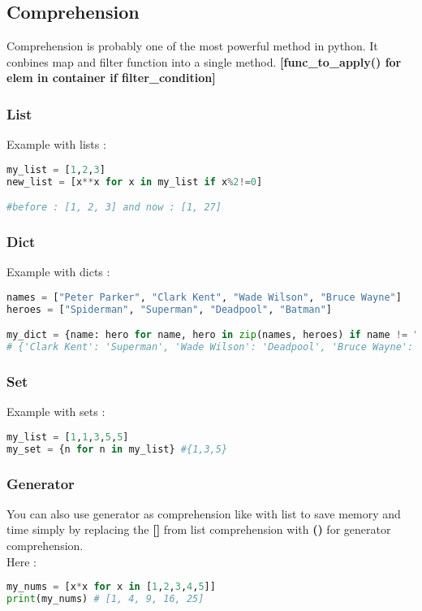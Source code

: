 \documentclass[a4paper, 12pt, titlepage]{scrartcl} %
\begin{document}
\subsection{Comprehension}
\label{Comprehension}
Comprehension is probably one of the most powerful method in python. It conbines map and filter function into a single method. \textbf{[func\_to\_apply() for elem in container if filter\_condition]} 

\subsubsection{List}
Example with lists :
\begin{lstlisting}[language=Python]
my_list = [1,2,3]
new_list = [x**x for x in my_list if x%2!=0]

#before : [1, 2, 3] and now : [1, 27]
\end{lstlisting}\vspace{5mm}

\subsubsection{Dict}
Example with dicts :
\begin{lstlisting}[language=Python]
names = ["Peter Parker", "Clark Kent", "Wade Wilson", "Bruce Wayne"]
heroes = ["Spiderman", "Superman", "Deadpool", "Batman"]

my_dict = {name: hero for name, hero in zip(names, heroes) if name != "Peter Parker"}
# {'Clark Kent': 'Superman', 'Wade Wilson': 'Deadpool', 'Bruce Wayne': 'Batman'}
\end{lstlisting} \vspace{5mm}

\subsubsection{Set}
Example with sets :
\begin{lstlisting}[language=Python]
my_list = [1,1,3,5,5]
my_set = {n for n in my_list} #{1,3,5}
\end{lstlisting} \vspace{5mm}

\subsubsection{Generator}
You can also use generator as comprehension like with list to save memory and time simply by replacing the \textbf{[]} from list comprehension with \textbf{()} for generator comprehension. \\
Here : 
\begin{lstlisting}[language=Python]
my_nums = [x*x for x in [1,2,3,4,5]]
print(my_nums) # [1, 4, 9, 16, 25]
\end{lstlisting} \vspace{5mm}
\end{document}
